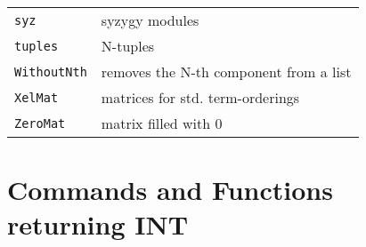 \documentclass[a4paper]{mybook}
\begin{document}
\begin{center}
\begin{longtable}{ll}
{\verb~syz~} &
      syzygy modules\\
   
{\verb~tuples~} &
      N-tuples\\
   
{\verb~WithoutNth~} &
      removes the N-th component from a list\\
   
{\verb~XelMat~} &
      matrices for std. term-orderings\\
   
{\verb~ZeroMat~} &
      matrix filled with 0\\
   
\end{longtable}
\end{center}

\noindent



\section{Commands and Functions returning INT}
\label{Commands and Functions returning INT}

        
\end{document}
